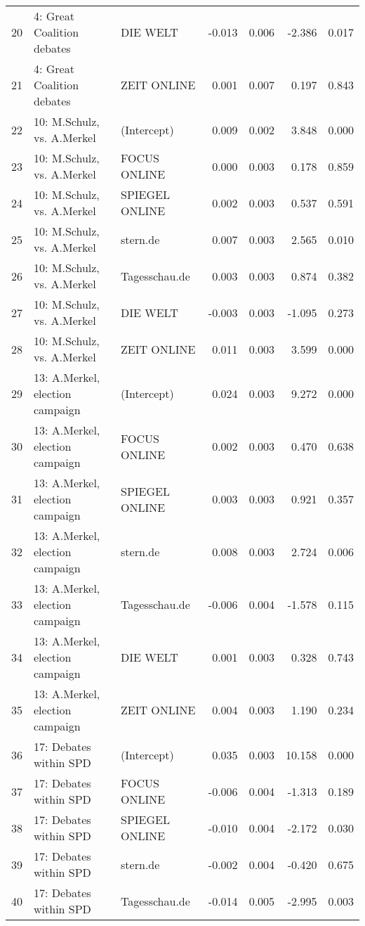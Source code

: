 \begin{table}[ht]
{\begin{tabular}{rllrrrr}
  20 & 4: Great Coalition debates & DIE WELT & -0.013 & 0.006 & -2.386 & 0.017 \\ 
  21 & 4: Great Coalition debates & ZEIT ONLINE & 0.001 & 0.007 & 0.197 & 0.843 \\ 
  22 & 10: M.Schulz, vs. A.Merkel & (Intercept) & 0.009 & 0.002 & 3.848 & 0.000 \\ 
  23 & 10: M.Schulz, vs. A.Merkel & FOCUS ONLINE & 0.000 & 0.003 & 0.178 & 0.859 \\ 
  24 & 10: M.Schulz, vs. A.Merkel & SPIEGEL ONLINE & 0.002 & 0.003 & 0.537 & 0.591 \\ 
  25 & 10: M.Schulz, vs. A.Merkel & stern.de & 0.007 & 0.003 & 2.565 & 0.010 \\ 
  26 & 10: M.Schulz, vs. A.Merkel & Tagesschau.de & 0.003 & 0.003 & 0.874 & 0.382 \\ 
  27 & 10: M.Schulz, vs. A.Merkel & DIE WELT & -0.003 & 0.003 & -1.095 & 0.273 \\ 
  28 & 10: M.Schulz, vs. A.Merkel & ZEIT ONLINE & 0.011 & 0.003 & 3.599 & 0.000 \\ 
  29 & 13: A.Merkel, election campaign & (Intercept) & 0.024 & 0.003 & 9.272 & 0.000 \\ 
  30 & 13: A.Merkel, election campaign & FOCUS ONLINE & 0.002 & 0.003 & 0.470 & 0.638 \\ 
  31 & 13: A.Merkel, election campaign & SPIEGEL ONLINE & 0.003 & 0.003 & 0.921 & 0.357 \\ 
  32 & 13: A.Merkel, election campaign & stern.de & 0.008 & 0.003 & 2.724 & 0.006 \\ 
  33 & 13: A.Merkel, election campaign & Tagesschau.de & -0.006 & 0.004 & -1.578 & 0.115 \\ 
  34 & 13: A.Merkel, election campaign & DIE WELT & 0.001 & 0.003 & 0.328 & 0.743 \\ 
  35 & 13: A.Merkel, election campaign & ZEIT ONLINE & 0.004 & 0.003 & 1.190 & 0.234 \\ 
  36 & 17: Debates within SPD & (Intercept) & 0.035 & 0.003 & 10.158 & 0.000 \\ 
  37 & 17: Debates within SPD & FOCUS ONLINE & -0.006 & 0.004 & -1.313 & 0.189 \\ 
  38 & 17: Debates within SPD & SPIEGEL ONLINE & -0.010 & 0.004 & -2.172 & 0.030 \\ 
  39 & 17: Debates within SPD & stern.de & -0.002 & 0.004 & -0.420 & 0.675 \\ 
  40 & 17: Debates within SPD & Tagesschau.de & -0.014 & 0.005 & -2.995 & 0.003 \\ 

\end{tabular}}
\end{table}
